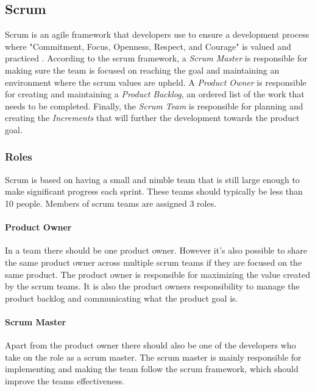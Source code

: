 \subsection{Scrum}
Scrum is an agile framework that developers use to ensure a development process where "Commitment, Focus, Openness, Respect, and Courage" is valued and practiced \cite{schwaber_sutherland_2022}. According to the scrum framework, a \emph{Scrum Master} is responsible for making sure the team is focused on reaching the goal and maintaining an environment where the scrum values are upheld. A \emph{Product Owner} is responsible for creating and maintaining a \emph{Product Backlog}, an ordered list of the work that needs to be completed. Finally, the \emph{Scrum Team} is responsible for planning and creating the \emph{Increments} that will further the development towards the product goal. 


\subsubsection{Roles}
Scrum is based on having a small and nimble team that is still large enough to make significant progress each sprint. 
These teams should typically be less than 10 people.
Members of scrum teams are assigned 3 roles. \cite{schwaber_sutherland_2022}

\paragraph{Product Owner}
In a team there should be one product owner. However it's also possible to share the same product owner across multiple scrum teams if they are focused on the same product.
The product owner is responsible for maximizing the value created by the scrum teams. It is also the product owners responsibility to manage the product backlog and communicating what the product goal is. \cite{schwaber_sutherland_2022}

\paragraph{Scrum Master}
Apart from the product owner there should also be one of the developers who take on the role as a scrum master.
The scrum master is mainly responsible for implementing and making the team follow the scrum framework, which should improve the teams effectiveness. \cite{schwaber_sutherland_2022}

